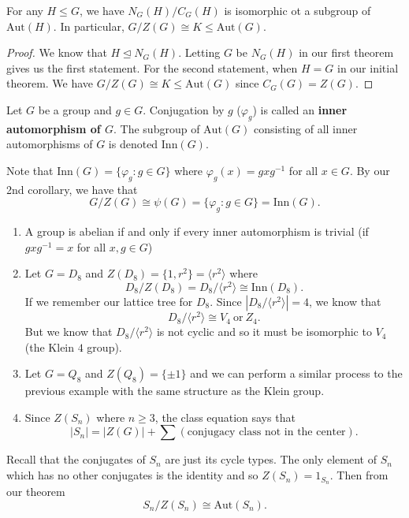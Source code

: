 \begin{corollary}
    For any \( H \leq G  \), we have 
    \(  {N}_{G}(H) / {C}_{G}(H)  \)
    is isomorphic ot a subgroup of \( \text{Aut}(H) \). In particular, \( G / Z(G) \cong K \leq \text{Aut}(G)  \).
\end{corollary}
\begin{proof}
We know that \( H \trianglelefteq {N}_{G}(H) \). Letting \( G  \) be \( {N}_{G}(H) \) in our first theorem gives us the first statement. For the second statement, when \( H = G  \) in our initial theorem. We have \( G / Z(G) \cong K \leq \text{Aut}(G) \) since \( {C}_{G}(G) = Z(G) \).
\end{proof}

\begin{definition}
    Let \( G  \) be a group and \( g \in G  \). Conjugation by \( g  \) (\( {\varphi}_{g} \)) is called an \textbf{inner automorphism of \( G  \)}.
The subgroup of \( \text{Aut}(G) \) consisting of all inner automorphisms of \( G \) is denoted \( \text{Inn}(G) \).
\end{definition}

Note that \( \text{Inn}(G) = \{  {\varphi}_{g} : g \in G  \}  \) where \( {\varphi}_{g}(x) = g x g^{-1}\) for all \( x \in G  \). By our 2nd corollary, we have that 
\[  G / Z(G) \cong \psi(G) = \{ {\varphi}_{g} : g \in G \} = \text{Inn}(G). \]

\begin{eg}
    \begin{enumerate}
        \item[(1)] A group is abelian if and only if every inner automorphism is trivial (if \( g x g^{-1} = x  \) for all \( x,g \in G  \))
        \item[(2)] Let \( G = {D}_{8} \) and \( Z({D}_{8} ) = \{  1, r^{2} \}  = \langle  r^{2} \rangle \) where 
            \[  {D}_{8} / Z({D}_{8}) = {D}_{8} / \langle  r^{2} \rangle \cong \text{Inn}({D}_{8}). \]
            If we remember our lattice tree for \( {D}_{8} \). Since \( | {D}_{8} / \langle  r^{2} \rangle |  =  4  \), we know that  
            \[  {D}_{8}/ \langle  r^{2} \rangle \cong {V}_{4} \ \text{or} \ {Z}_{4}. \]
            But we know that \( {D}_{8} / \langle  r^{2} \rangle \) is not cyclic and so it must be isomorphic to \( {V}_{4}  \) (the Klein \( 4  \) group).
        \item Let \( G = {Q}_{8}  \) and \( Z({Q}_{8}) = \{  \pm 1  \}  \) and we can perform a similar process to the previous example with the same structure as the Klein group.
        \item Since \( Z({S}_{n}) \) where \( n \geq 3  \), the class equation says that 
        \[  | {S}_{n} |  = | Z(G) |  + \sum (\text{conjugacy class not in the center}). \]
    \end{enumerate}
    Recall that the conjugates of \( {S}_{n} \) are just its cycle types.
    The only element of \( {S}_{n} \) which has no other conjugates is the identity and so \( Z({S}_{n}) = {1}_{{S}_{n}} \). Then from our theorem 
    \[  {S}_{n} / Z({S}_{n}) \cong \text{Aut}({S}_{n}). \]
\end{eg}

